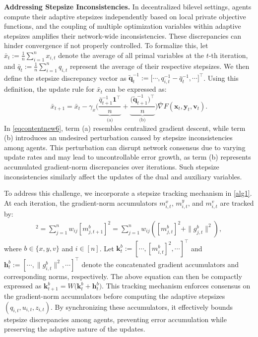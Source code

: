 \documentclass{article}
\theoremstyle{plain}
\theoremstyle{definition}
\theoremstyle{remark}
\begin{document}
\textbf{Addressing Stepsize Inconsistencies.} In decentralized bilevel settings, agents compute their adaptive stepsizes independently based on local private objective functions, and the coupling of multiple optimization variables within adaptive stepsizes amplifies their network-wide inconsistencies. These discrepancies can hinder convergence if not properly controlled. To formalize this, let \(\bar{x}_t := \frac{1}{n} \sum_{i=1}^n x_{i,t}\) denote the average of all primal variables at the \(t\)-th iteration, and \(\bar{q}_t := \frac{1}{n} \sum_{i=1}^n q_{i,t}\) represent the average of their respective stepsizes. We then define the stepsize discrepancy vector as \(\tilde{\mathbf{q}}_t^{-1} := \big[ \cdots, q_{i,t}^{-1} - \bar{q}_t^{-1}, \cdots \big]^\top\). Using this definition, the update rule for \(\bar{x}_t\) can be expressed as:  
\begin{equation}\label{eqcontentnew6}
\bar{x}_{t+1} = \bar{x}_t - \gamma_x \bigg(\underbrace{\frac{\bar{q}_{t+1}^{-1} \mathbf{1}^\top}{n}}_{\text{(a)}} 
+ \underbrace{\frac{\big(\tilde{\mathbf{q}}_{t+1}^{-1}\big)^\top}{n}}_{\text{(b)}} \bigg) \bar{\nabla} F(\mathbf{x}_t, \mathbf{y}_t, \mathbf{v}_t).
\end{equation}  
In \cref{eqcontentnew6}, term (a) resembles centralized gradient descent, while term (b) introduces an undesired perturbation caused by stepsize inconsistencies among agents. This perturbation can disrupt network consensus due to varying update rates and may lead to uncontrollable error growth, as term (b) represents accumulated gradient-norm discrepancies over iterations. Such stepsize inconsistencies similarly affect the updates of the dual and auxiliary variables.  

To address this challenge, we incorporate a stepsize tracking mechanism in \cref{alg1}. At each iteration, the gradient-norm accumulators $m^x_{i,t}$, $m^y_{i,t}$, and $m^v_{i,t}$ are tracked by:  
\begin{align*}
[m^b_{i,t+1}]^2 = \sum_{j=1}^n w_{ij}[m^b_{j,t+1}]^2 = \sum_{j=1}^n w_{ij} \left([m^b_{j,t}]^2 + \|g^b_{j,t}\|^2 \right)\!,
\end{align*}
where $b \in \{x, y, v\}$ and $i \in [n]$. Let $\mathbf{k}^b_t := \left[\cdots, [m^b_{i,t}]^2, \cdots\right]^{\top}$ and $\mathbf{h}^b_t := \left[\cdots, \|g^b_{i,t}\|^2, \cdots\right]^{\top}$ denote the concatenated gradient accumulators and corresponding norms, respectively. The above equation can then be compactly expressed as
$\mathbf{k}^b_{t+1} = W \big(\mathbf{k}^b_t + \mathbf{h}^b_t\big).$
This tracking mechanism enforces consensus on the gradient-norm accumulators before computing the adaptive stepsizes $(q_{i,t}, u_{i,t}, z_{i,t})$. By synchronizing these accumulators, it effectively bounds stepsize discrepancies among agents, preventing error accumulation while preserving the adaptive nature of the updates.
\end{document}

